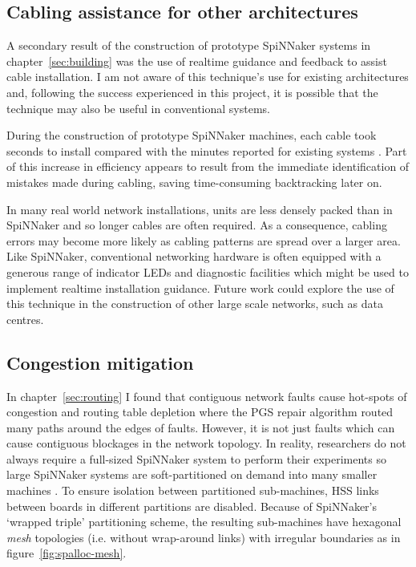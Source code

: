 		\subsection{Cabling assistance for other architectures}
			
			A secondary result of the construction of prototype SpiNNaker systems in
			chapter~\ref{sec:building} was the use of realtime guidance and feedback
			to assist cable installation. I am not aware of this technique's use for
			existing architectures and, following the success experienced in this
			project, it is possible that the technique may also be useful in
			conventional systems.
			
			During the construction of prototype SpiNNaker machines, each cable took
			seconds to install compared with the minutes reported for existing
			systems \cite{mudigonda11}. Part of this increase in efficiency appears
			to result from the immediate identification of mistakes made during
			cabling, saving time-consuming backtracking later on.
			
			In many real world network installations, units are less densely packed
			than in SpiNNaker and so longer cables are often required. As a
			consequence, cabling errors may become more likely as cabling patterns
			are spread over a larger area. Like SpiNNaker, conventional networking
			hardware is often equipped with a generous range of indicator LEDs and
			diagnostic facilities which might be used to implement realtime
			installation guidance. Future work could explore the use of this
			technique in the construction of other large scale networks, such as data
			centres.
		
		\subsection{Congestion mitigation}
			
			\label{sec:wiggly-board-allocations}
			
			In chapter~\ref{sec:routing} I found that contiguous network faults cause
			hot-spots of congestion and routing table depletion where the PGS repair
			algorithm routed many paths around the edges of faults.  However, it is
			not just faults which can cause contiguous blockages in the network
			topology. In reality, researchers do not always require a full-sized
			SpiNNaker system to perform their experiments so large SpiNNaker systems
			are soft-partitioned on demand into many smaller machines
			\cite{spalloc16}. To ensure isolation between partitioned sub-machines,
			HSS links between boards in different partitions are disabled. Because of
			SpiNNaker's `wrapped triple' partitioning scheme, the resulting
			sub-machines have hexagonal \emph{mesh} topologies (i.e.  without
			wrap-around links) with irregular boundaries as in
			figure~\ref{fig:spalloc-mesh}.
			
